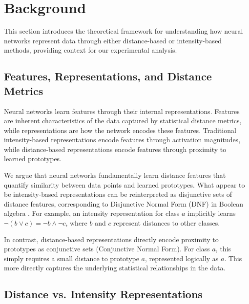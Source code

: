 \section{Background}
\label{sec:background}

This section introduces the theoretical framework for understanding how neural networks represent data through either distance-based or intensity-based methods, providing context for our experimental analysis.

\subsection{Features, Representations, and Distance Metrics}

Neural networks learn features through their internal representations. Features are inherent characteristics of the data captured by statistical distance metrics, while representations are how the network encodes these features. Traditional intensity-based representations encode features through activation magnitudes, while distance-based representations encode features through proximity to learned prototypes.

We argue that neural networks fundamentally learn distance features that quantify similarity between data points and learned prototypes. What appear to be intensity-based representations can be reinterpreted as disjunctive sets of distance features, corresponding to Disjunctive Normal Form (DNF) in Boolean algebra \cite{post1921introduction}. For example, an intensity representation for class $a$ implicitly learns $\lnot(b \lor c) = \lnot b \land \lnot c$, where $b$ and $c$ represent distances to other classes.

In contrast, distance-based representations directly encode proximity to prototypes as conjunctive sets (Conjunctive Normal Form). For class $a$, this simply requires a small distance to prototype $a$, represented logically as $a$. This more directly captures the underlying statistical relationships in the data.

\subsection{Distance vs. Intensity Representations}
\label{subsec:dist-intensity-rep}


